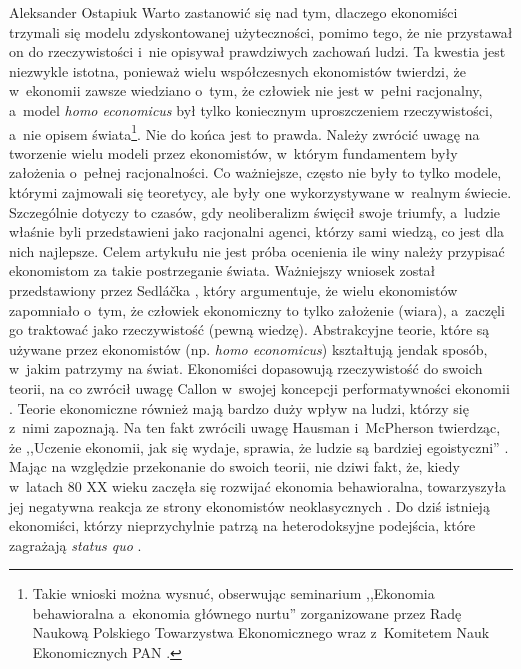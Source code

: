 \begin{artplenv}{Aleksander Ostapiuk}
Warto zastanowić się nad tym, dlaczego ekonomiści trzymali się modelu zdyskontowanej użyteczności, pomimo tego, że nie
przystawał on do rzeczywistości i~nie opisywał prawdziwych zachowań ludzi. Ta kwestia jest niezwykle istotna, ponieważ
wielu współczesnych ekonomistów twierdzi, że w~ekonomii zawsze wiedziano o~tym, że człowiek nie jest w~pełni
racjonalny, a~model \textit{homo economicus} był tylko koniecznym uproszczeniem rzeczywistości, a~nie opisem
świata\footnote{Takie wnioski można wysnuć, obserwując seminarium ,,Ekonomia behawioralna a~ekonomia głównego nurtu''
zorganizowane przez Radę Naukową Polskiego Towarzystwa Ekonomicznego wraz z~Komitetem Nauk Ekonomicznych PAN
\parencite[zob.][]{noauthor_stenogram_2018}.
}. Nie do końca jest to prawda. Należy zwrócić uwagę na tworzenie wielu modeli przez
ekonomistów, w~którym fundamentem były założenia o~pełnej racjonalności. Co ważniejsze, często nie były to tylko modele, którymi
zajmowali się teoretycy, ale były one wykorzystywane w~realnym świecie. Szczególnie dotyczy to czasów, gdy
neoliberalizm święcił swoje triumfy, a~ludzie właśnie byli przedstawieni jako racjonalni agenci, którzy sami wiedzą, co
jest dla nich najlepsze. Celem artykułu nie jest próba ocenienia ile winy należy przypisać ekonomistom za takie
postrzeganie świata. Ważniejszy wniosek został przedstawiony przez Sedláčka
\parencite*{sedlacek_ekonomia_2012},
który
argumentuje, że wielu ekonomistów zapomniało o~tym, że człowiek ekonomiczny to tylko założenie (wiara), a~zaczęli go
traktować jako rzeczywistość (pewną wiedzę). Abstrakcyjne teorie, które są używane przez ekonomistów (np. \textit{homo
economicus}) kształtują jendak sposób, w~jakim patrzymy na świat. Ekonomiści dopasowują rzeczywistość do swoich teorii,
na co zwrócił uwagę Callon w~swojej koncepcji performatywności ekonomii
\parencites{callon_what_2006}[więcej zob.][]{boldyrev_enacting_2016}.
Teorie ekonomiczne również mają bardzo duży wpływ na ludzi, którzy się z~nimi
zapoznają. Na ten fakt zwrócili uwagę Hausman i~McPherson twierdząc, że ,,Uczenie ekonomii, jak się wydaje, sprawia, że
ludzie są bardziej egoistyczni''
\parencite[s.~674]{hausman_taking_1993}.
Mając na względzie
przekonanie do swoich teorii, nie dziwi fakt, że, kiedy w~latach 80 XX wieku zaczęła się rozwijać ekonomia
behawioralna, towarzyszyła jej negatywna reakcja ze strony ekonomistów neoklasycznych
\parencite[zob.][]{thaler_misbehaving:_2015}.
Do dziś istnieją ekonomiści, którzy nieprzychylnie patrzą na heterodoksyjne podejścia, które zagrażają
\textit{status quo}
\parencite[zob.][]{fourcade_superiority_2015,colander_how_2018}.


\end{artplenv}
